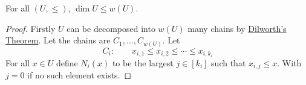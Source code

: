 \begin{lemma}{}{}
	For all $(U,\leq)$, $\dim U\leq w(U)$.
\end{lemma}
\begin{proof}
	Firstly $U$ can be decomposed into $w(U)$ many chains by \hyperref[th:dilworth]{Dilworth's Theorem}. Let the chains are $C_1,\dots, C_{w(U)}$. Let $$C_i:\qquad x_{i,1}\leq x_{i,2}\leq\cdots\leq x_{i,k_i}$$For all $x\in U$ define $N_i(x)$ to be the largest $j\in[k_i]$ such that $x_{i,j}\leq x$. With $j=0$ if no such element exists. 
\end{proof}
